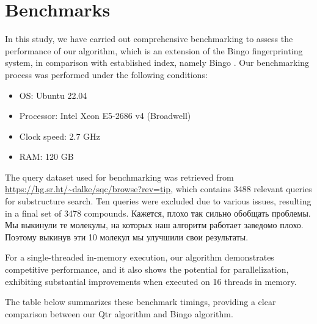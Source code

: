 \section{Benchmarks}

In this study, we have carried out comprehensive benchmarking to assess the performance of our algorithm, which is an extension 
of the Bingo fingerprinting system, in comparison with established index, namely Bingo \cite{Pavlov2010}.
Our benchmarking process 
was performed under the following conditions:

\begin{itemize}
\item OS: Ubuntu 22.04
\item Processor: Intel Xeon E5-2686 v4 (Broadwell)
\item Clock speed: 2.7 GHz
\item RAM: 120 GB
\end{itemize}

The query dataset used for benchmarking was retrieved from \url{https://hg.sr.ht/~dalke/sqc/browse?rev=tip}, which contains 3488 
relevant queries for substructure search. Ten queries were excluded due to various issues, resulting in a final set of 3478 compounds.
{\color{red} Кажется, плохо так сильно обобщать проблемы. Мы выкинули те молекулы, на которых наш алгоритм работает заведомо плохо. Поэтому выкинув эти 10 молекул мы улучшили свои результаты}.

For a single-threaded in-memory execution, our algorithm demonstrates competitive performance, and it also shows the potential for 
parallelization, exhibiting substantial improvements when executed on 16 threads in memory.

The table below summarizes these benchmark timings, providing a clear comparison between our Qtr algorithm and Bingo algorithm.

